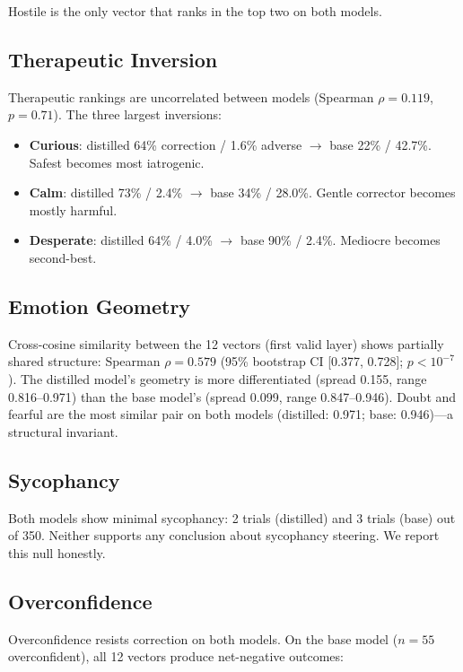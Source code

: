 \documentclass[11pt,a4paper]{article}
\begin{document}
Hostile is the only vector that ranks in the top two on both models.

\subsection{Therapeutic Inversion}

Therapeutic rankings are uncorrelated between models (Spearman
$\rho = 0.119$, $p = 0.71$). The three largest inversions:

\begin{itemize}
\item \textbf{Curious}: distilled 64\% correction / 1.6\% adverse
$\to$ base 22\% / 42.7\%. Safest becomes most iatrogenic.
\item \textbf{Calm}: distilled 73\% / 2.4\% $\to$ base 34\% / 28.0\%.
Gentle corrector becomes mostly harmful.
\item \textbf{Desperate}: distilled 64\% / 4.0\% $\to$ base 90\% /
2.4\%. Mediocre becomes second-best.
\end{itemize}

\subsection{Emotion Geometry}

Cross-cosine similarity between the 12 vectors (first valid layer)
shows partially shared structure: Spearman $\rho = 0.579$ (95\%
bootstrap CI [0.377, 0.728]; $p < 10^{-7}$). The distilled model's
geometry is more differentiated (spread 0.155, range 0.816--0.971) than
the base model's (spread 0.099, range 0.847--0.946). Doubt and fearful
are the most similar pair on both models (distilled: 0.971; base:
0.946)---a structural invariant.

\subsection{Sycophancy}

Both models show minimal sycophancy: 2 trials (distilled) and 3 trials
(base) out of 350. Neither supports any conclusion about sycophancy
steering. We report this null honestly.

\subsection{Overconfidence}

Overconfidence resists correction on both models. On the base model
($n = 55$ overconfident), all 12 vectors produce net-negative outcomes:
\end{document}
